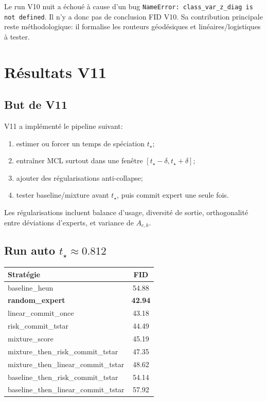 \documentclass[11pt,a4paper]{article}
\newcommand{\1}{\mathbf{1}}
\begin{document}
Le run V10 nuit a échoué à cause d'un bug \texttt{NameError: class\_var\_z\_diag is not defined}. Il n'y a donc pas de conclusion FID V10. Sa contribution principale reste méthodologique: il formalise les routeurs géodésiques et linéaires/logistiques à tester.

\section{Résultats V11}

\subsection{But de V11}

V11 a implémenté le pipeline suivant:
\begin{enumerate}[leftmargin=2em]
\item estimer ou forcer un temps de spéciation $t_\star$;
\item entraîner MCL surtout dans une fenêtre $[t_\star-\delta,t_\star+\delta]$;
\item ajouter des régularisations anti-collapse;
\item tester baseline/mixture avant $t_\star$, puis commit expert une seule fois.
\end{enumerate}

Les régularisations incluent balance d'usage, diversité de sortie, orthogonalité entre déviations d'experts, et variance de $A_{c,k}$.

\subsection{Run auto $t_\star\approx0.812$}

\begin{center}
\begin{tabular}{lc}
\toprule
Stratégie & FID\\
\midrule
baseline\_heun & 54.88\\
\textbf{random\_expert} & \textbf{42.94}\\
linear\_commit\_once & 43.18\\
risk\_commit\_tstar & 44.49\\
mixture\_score & 45.19\\
mixture\_then\_risk\_commit\_tstar & 47.35\\
mixture\_then\_linear\_commit\_tstar & 48.62\\
baseline\_then\_risk\_commit\_tstar & 54.14\\
baseline\_then\_linear\_commit\_tstar & 57.92\\
\bottomrule
\end{tabular}
\end{center}
\end{document}
